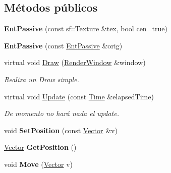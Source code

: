 \subsection*{Métodos públicos}
\begin{DoxyCompactItemize}
\item 
\hypertarget{classEntPassive_a78cb6699f982f1eb3cf6b5192d38041e}{{\bfseries Ent\-Passive} (const sf\-::\-Texture \&tex, bool cen=true)}\label{classEntPassive_a78cb6699f982f1eb3cf6b5192d38041e}

\item 
\hypertarget{classEntPassive_a091c15b59be85d06872f1e6ac3d40f48}{{\bfseries Ent\-Passive} (const \hyperlink{classEntPassive}{Ent\-Passive} \&orig)}\label{classEntPassive_a091c15b59be85d06872f1e6ac3d40f48}

\item 
\hypertarget{classEntPassive_a116e6ea82a729055fce25902ca356d92}{virtual void \hyperlink{classEntPassive_a116e6ea82a729055fce25902ca356d92}{Draw} (\hyperlink{classRenderWindow}{Render\-Window} \&window)}\label{classEntPassive_a116e6ea82a729055fce25902ca356d92}

\begin{DoxyCompactList}\small\item\em Realiza un Draw simple. \end{DoxyCompactList}\item 
\hypertarget{classEntPassive_affdc25a39874ec0e9de12f650b9619ed}{virtual void \hyperlink{classEntPassive_affdc25a39874ec0e9de12f650b9619ed}{Update} (const \hyperlink{classTime}{Time} \&elapsed\-Time)}\label{classEntPassive_affdc25a39874ec0e9de12f650b9619ed}

\begin{DoxyCompactList}\small\item\em De momento no hará nada el update. \end{DoxyCompactList}\item 
\hypertarget{classEntPassive_aed5dc26f36af81a420a045b936b6485c}{void {\bfseries Set\-Position} (const \hyperlink{classVector}{Vector} \&v)}\label{classEntPassive_aed5dc26f36af81a420a045b936b6485c}

\item 
\hypertarget{classEntPassive_a76fafa1619fae14af0653de63bda7449}{\hyperlink{classVector}{Vector} {\bfseries Get\-Position} ()}\label{classEntPassive_a76fafa1619fae14af0653de63bda7449}

\item 
\hypertarget{classEntPassive_acceb3800d94b194628fc49dba5ca95df}{void {\bfseries Move} (\hyperlink{classVector}{Vector} v)}\label{classEntPassive_acceb3800d94b194628fc49dba5ca95df}

\end{DoxyCompactItemize}
